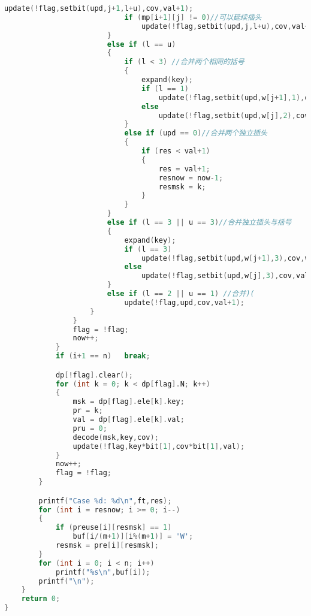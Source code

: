 \begin{lstlisting}[language=c++]
								update(!flag,setbit(upd,j+1,l+u),cov,val+1);
							if (mp[i+1][j] != 0)//可以延续插头
								update(!flag,setbit(upd,j,l+u),cov,val+1);
						}
						else if (l == u)
						{
							if (l < 3) //合并两个相同的括号
							{
								expand(key);
								if (l == 1)
									update(!flag,setbit(upd,w[j+1],1),cov,val+1);
								else
									update(!flag,setbit(upd,w[j],2),cov,val+1);
							}
							else if (upd == 0)//合并两个独立插头
							{
								if (res < val+1)
								{
									res = val+1;
									resnow = now-1;
									resmsk = k;
								}
							}
						}
						else if (l == 3 || u == 3)//合并独立插头与括号
						{
							expand(key);
							if (l == 3)
								update(!flag,setbit(upd,w[j+1],3),cov,val+1);
							else
								update(!flag,setbit(upd,w[j],3),cov,val+1);
						}
						else if (l == 2 || u == 1) //合并)(
							update(!flag,upd,cov,val+1);
					}
				}
				flag = !flag;
				now++;
			}
			if (i+1 == n)   break;

			dp[!flag].clear();
			for (int k = 0; k < dp[flag].N; k++)
			{
				msk = dp[flag].ele[k].key;
				pr = k;
				val = dp[flag].ele[k].val;
				pru = 0;
				decode(msk,key,cov);
				update(!flag,key*bit[1],cov*bit[1],val);
			}
			now++;
			flag = !flag;
		}

		printf("Case %d: %d\n",ft,res);
		for (int i = resnow; i >= 0; i--)
		{
			if (preuse[i][resmsk] == 1)
				buf[i/(m+1)][i%(m+1)] = 'W';
			resmsk = pre[i][resmsk];
		}
		for (int i = 0; i < n; i++)
			printf("%s\n",buf[i]);
		printf("\n");
	}
	return 0;
}
	\end{lstlisting}